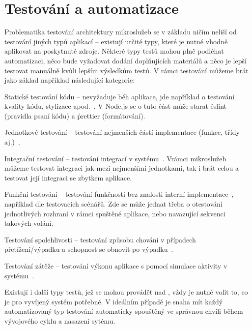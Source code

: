 \section{Testování a automatizace}\label{sec:testing}

Problematika testování architektury mikroslužeb se v základu ničím neliší od testování jiných typů aplikací – existují určité typy, které je nutné vhodně aplikovat na poskytnuté zdroje.
Některé typy testů mohou plně podléhat automatizaci, něco bude vyžadovat dodání doplňujících materiálů a něco je lepší testovat manuálně kvůli lepším výsledkům testů.
V rámci testování  můžeme brát jako základ například následující kategorie:

\begin{dl}
   \item[Statické testování kódu] – nevyžaduje běh aplikace, jde například o testování kvality kódu, stylizace apod.~\cite{statictest}.
   V Node.js se o tuto část může starat \h{eslint} (pravidla psaní kódu) a \h{prettier} (formátování).
   \item[Jednotkové testování] – testování nejmenších částí implementace (funkce, třídy aj.)~\cite{unitinttest}.
   \item[Integrační testování] – testování integrací v systému~\cite{unitinttest}.
   Vrámci mikroslužeb můžeme testovat integraci jak mezi nejmenšími jednotkami, tak i brát celou  a testovat její integraci se zbytkem aplikace.
   \item[Funkční testování] – testování funkčnosti bez znalosti interní implementace~\cite{testtypes}, například dle testovacích scénářů.
   Zde se může jednat třeba o otestování jednotlivých rozhraní v rámci spuštěné aplikace, nebo navazující sekvenci takových volání.
   \item[Testování spolehlivosti] – testování způsobu chování v případech přetížení/výpadku a schopnost se obnovit po výpadku~\cite{testtypes2}.
   \item[Testování zátěže] – testování výkonu aplikace s pomocí simulace aktivity v systému~\cite{loadtest}.
\end{dl}

Existují i další typy testů, jež se mohou provádět nad , vždy je nutné volit to, co je pro vyvíjený systém potřebné.
V ideálním případě je snaha mít každý automatizovaný typ testování automaticky spouštěný ve správnou chvíli během vývojového cyklu a nasazení sytému.
